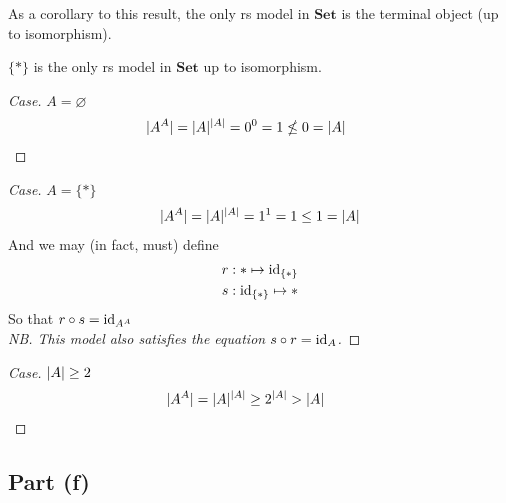 As a corollary to this result, the only rs model in $\mathbf{Set}$ is the terminal object (up to isomorphism).

\begin{prop}
  $\{\ast\}$ is the only rs model in $\mathbf{Set}$ up to isomorphism.
  \begin{proof}[Case]
    $A = \varnothing$
    \begin{align*}
      \lvert A^A\rvert = \lvert A\rvert^{\lvert A\rvert} = 0^0 = 1 \nleq 0 = \lvert A\rvert
      \tag*{\qedhere}
    \end{align*}
  \end{proof}

  \begin{proof}[Case]
    $A = \{\ast\}$
    \begin{align*}
      \lvert A^A\rvert = \lvert A\rvert^{\lvert A\rvert} = 1^1 = 1 \leq 1 = \lvert A\rvert
    \end{align*}
    And we may (in fact, must) define
    \begin{align*}
      r & : \ast \mapsto \operatorname{id}_{\{\ast\}}\\
      s & : \operatorname{id}_{\{\ast\}} \mapsto \ast
    \end{align*}
    So that $r\circ s = \operatorname{id}_{A^A}$\qedhere\\
    \noindent\textit{NB. This model also satisfies the equation $s\circ r = \operatorname{id}_A$.}
  \end{proof}
  \begin{proof}[Case]
    $\lvert A\rvert\geq 2$
    \begin{align*}
      \lvert A^A\rvert = \lvert A\rvert^{\lvert A\rvert} \geq 2^{\lvert A\rvert} > \lvert A\rvert
      \tag*{\qedhere}
    \end{align*}
  \end{proof}
\end{prop}

\subsection{Part (f)}\label{sec:q-2-f}

